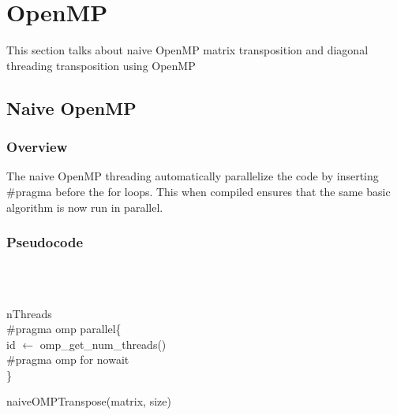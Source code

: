 \documentclass[12pt, a4paper, fleqn, titlepage]{article}
\begin{document}
\section{OpenMP}
    This section talks about naive OpenMP matrix transposition and diagonal threading transposition using OpenMP
    \subsection{Naive OpenMP}
        \subsubsection{Overview}
        The naive OpenMP threading automatically parallelize the code by inserting \#pragma before the for loops. This when compiled ensures that the same basic algorithm is now run in parallel.
        \subsubsection{Pseudocode}
        \begin{algorithm}[H]
            \\
            \\
            \linebreak
                
            nThreads\\
            \#pragma omp parallel\{ \\
                \quad id $\leftarrow$ omp\_get\_num\_threads()\\
                \quad {}
                \quad \#pragma omp for nowait \\
                \quad {}
            \}
            \begin{flushleft}
                \caption{naiveOMPTranspose(matrix, size)
                }
            \end{flushleft}
        \end{algorithm}
\end{document}
